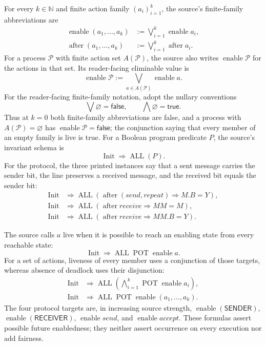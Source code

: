 For every \(k\in\mathbb N\) and finite action family
\((a_i)_{i=1}^{k}\), the source's finite-family abbreviations are
\[
\begin{aligned}
 \operatorname{enable}(a_1,\ldots,a_k)
   &:=\bigvee_{i=1}^{k}\operatorname{enable}a_i,\\
 \operatorname{after}(a_1,\ldots,a_k)
   &:=\bigvee_{i=1}^{k}\operatorname{after}a_i.
\end{aligned}
\]
For a process \(\mathcal P\) with finite action set \(A(\mathcal P)\), the
source also writes \(\operatorname{enable}\mathcal P\) for the actions in that
set.  Its reader-facing eliminable value is
\[
 \operatorname{enable}\mathcal P
 :=\bigvee_{a\in A(\mathcal P)}\operatorname{enable}a.
\]
For the reader-facing finite-family notation, adopt the nullary conventions
\[
 \bigvee\varnothing=\mathsf{false},
 \qquad
 \bigwedge\varnothing=\mathsf{true}.
\]
Thus at \(k=0\) both finite-family abbreviations are false, and a process with
\(A(\mathcal P)=\varnothing\) has
\(\operatorname{enable}\mathcal P=\mathsf{false}\); the conjunction saying
that every member of an empty family is live is true.  For a Boolean program
predicate \(P\), the source's invariant schema is
\[
 \operatorname{Init}\Rightarrow\operatorname{ALL}(P).
\]
For the protocol, the three printed instances say that a sent message carries
the sender bit, the line preserves a received message, and the received bit
equals the sender bit:
\[
\begin{aligned}
\operatorname{Init}&\Rightarrow
 \operatorname{ALL}(
   \operatorname{after}(\mathit{send},\mathit{repeat})\Rightarrow M.B=Y),\\
\operatorname{Init}&\Rightarrow
 \operatorname{ALL}(\operatorname{after}\mathit{receive}\Rightarrow MM=M),\\
\operatorname{Init}&\Rightarrow
 \operatorname{ALL}(\operatorname{after}\mathit{receive}\Rightarrow MM.B=Y).
\end{aligned}
\]

The source calls \(a\) live when it is possible to reach an enabling state
from every reachable state:
\[
 \operatorname{Init}\Rightarrow
 \operatorname{ALL}\operatorname{POT}\operatorname{enable}a.
\]
For a set of actions, liveness of every member uses a conjunction of those
targets, whereas absence of deadlock uses their disjunction:
\[
\begin{aligned}
\operatorname{Init}&\Rightarrow
 \operatorname{ALL}\left(
   \bigwedge_{i=1}^{k}\operatorname{POT}\operatorname{enable}a_i\right),\\
\operatorname{Init}&\Rightarrow
 \operatorname{ALL}\operatorname{POT}
   \operatorname{enable}(a_1,\ldots,a_k).
\end{aligned}
\]
The four protocol targets are, in increasing source strength,
\(\operatorname{enable}(\mathsf{SENDER})\),
\(\operatorname{enable}(\mathsf{RECEIVER})\),
\(\operatorname{enable}\mathit{send}\), and
\(\operatorname{enable}\mathit{accept}\).  These formulas assert possible
future enabledness; they neither assert occurrence on every execution nor add
fairness.

